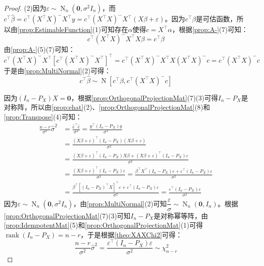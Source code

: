 \begin{proof}
	(2)因为$\varepsilon\sim\operatorname{N}_n(\mathbf{0},\sigma^2I_n)$，而$c^{\top}\hat{\beta}=c^{\top}(X^{\top}X)^-X^{\top}y=c^{\top}(X^{\top}X)^-X^{\top}(X\beta+\varepsilon)$。因为$c^{\top}\beta$是可估函数，所以由\cref{prop:EstimableFunction}(1)可知存在$\alpha$使得$c=X^{\top}\alpha$，根据\cref{prop:A-}(7)可知：
	\begin{equation*}
		c^{\top}(X^{\top}X)^-X^{\top}X\beta=c^{\top}\beta
	\end{equation*}
	由\cref{prop:A-}(5)(7)可知：
	\begin{equation*}
		c^{\top}(X^{\top}X)^-X^{\top}[c^{\top}(X^{\top}X)^-X^{\top}]^{\top}=c^{\top}(X^{\top}X)^-X^{\top}X(X^{\top}X)^-c=c^{\top}(X^{\top}X)^-c
	\end{equation*}
	于是由\cref{prop:MultiNormal}(2)可得：
	\begin{equation*}
		c^{\top}\hat{\beta}\sim\operatorname{N}[c^{\top}\beta,c^{\top}(X^{\top}X)^-c]
	\end{equation*}\par
	因为$(I_n-P_X)X=\mathbf{0}$，根据\cref{prop:OrthogonalProjectionMat}(7)(3)可得$I_n-P_X$是对称阵，所以由\cref{prop:ehat}(2)、\cref{prop:OrthogonalProjectionMat}(8)和\cref{prop:Transpose}(4)可知：
	\begin{align*}
		\frac{n-r}{\sigma^2}\hat{\sigma}^2&=\frac{\hat{e}^{\top}\hat{e}}{\sigma^2}=\frac{y^{\top}(I_n-P_X)y}{\sigma^2} \\
		&=\frac{(X\beta+\varepsilon)^{\top}(I_n-P_X)(X\beta+\varepsilon)}{\sigma^2} \\
		&=\frac{(X\beta+\varepsilon)^{\top}(I_n-P_X)X\beta+(X\beta+\varepsilon)^{\top}(I_n-P_X)\varepsilon}{\sigma^2} \\
		&=\frac{(X\beta+\varepsilon)^{\top}(I_n-P_X)\varepsilon}{\sigma^2}=\frac{\beta^{\top}X^{\top}(I_n-P_X)\varepsilon+\varepsilon^{\top}(I_n-P_X)\varepsilon}{\sigma^2} \\
		&=\frac{\beta^{\top}[(I_n-P_X)^{\top}X]^{\top}\varepsilon+\varepsilon^{\top}(I_n-P_X)\varepsilon}{\sigma^2}=\frac{\varepsilon^{\top}(I_n-P_X)\varepsilon}{\sigma^2}
	\end{align*}
	因为$\varepsilon\sim\operatorname{N}_n(\mathbf{0},\sigma^2I_n)$，由\cref{prop:MultiNormal}(2)可知$\dfrac{\varepsilon}{\sigma}\sim\operatorname{N}_n(\mathbf{0},I_n)$。根据\cref{prop:OrthogonalProjectionMat}(7)(3)可知$I_n-P_X$是对称幂等阵，由\cref{prop:IdempotentMat}(5)和\cref{prop:OrthogonalProjectionMat}(1)可得$\operatorname{rank}(I_n-P_X)=n-r$，于是根据\cref{theo:XAXChi2}可得：
	\begin{equation*}
		\frac{n-r}{\sigma^2}\hat{\sigma}^2=\frac{\varepsilon^{\top}(I_n-P_X)\varepsilon}{\sigma^2}\sim\chi_{n-r}^2

\end{equation*}
\end{proof}

